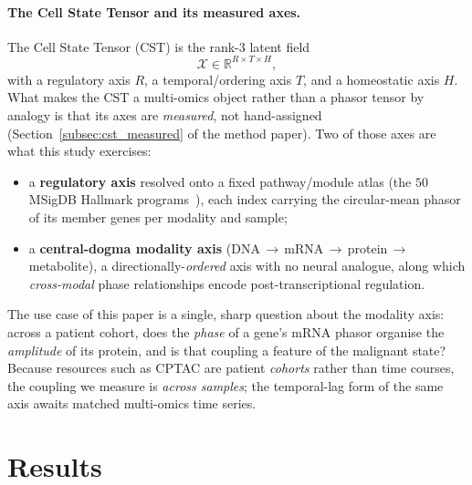 \documentclass[preprint,12pt,amsmath,amssymb,superscriptaddress,floatfix]{revtex4-2}
\newcommand{\reals}{\mathbb{R}}
\begin{document}
\paragraph{The Cell State Tensor and its measured axes.}
The Cell State Tensor (CST) is the rank-3 latent field
\begin{equation}
  \mathcal{X}\in\reals^{R\times T\times H},
  \label{eq:cst_def}
\end{equation}
with a regulatory axis $R$, a temporal/ordering axis $T$, and a homeostatic axis
$H$. What makes the CST a multi-omics object rather than a phasor tensor by
analogy is that its axes are \emph{measured}, not hand-assigned
(Section~\ref{subsec:cst_measured} of the method paper). Two of those axes are
what this study exercises:
\begin{itemize}
  \item a \textbf{regulatory axis} resolved onto a fixed pathway/module atlas
  (the $50$ MSigDB Hallmark programs~\cite{ref_liberzon_hallmark}), each index
  carrying the circular-mean phasor of its member genes per modality and sample;
  \item a \textbf{central-dogma modality axis}
  (DNA\,$\rightarrow$\,mRNA\,$\rightarrow$\,protein\,$\rightarrow$\,metabolite),
  a directionally-\emph{ordered} axis with no neural analogue, along which
  \emph{cross-modal} phase relationships encode post-transcriptional regulation.
\end{itemize}
\label{subsec:cst_measured}
The use case of this paper is a single, sharp question about the modality axis:
across a patient cohort, does the \emph{phase} of a gene's mRNA phasor organise
the \emph{amplitude} of its protein, and is that coupling a feature of the
malignant state? Because resources such as CPTAC are patient \emph{cohorts}
rather than time courses, the coupling we measure is \emph{across samples}; the
temporal-lag form of the same axis awaits matched multi-omics time series.

\section{Results}
\label{sec:results}
\end{document}
